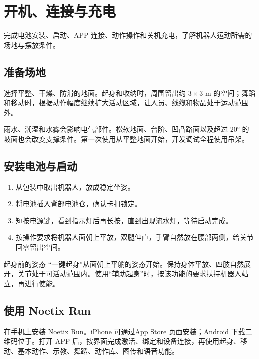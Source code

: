 \chapter{开机、连接与充电}

\begin{intro}
完成电池安装、启动、APP 连接、动作操作和关机充电，了解机器人运动所需的场地与摆放条件。
\end{intro}
\section{准备场地}
选择平整、干燥、防滑的地面。起身和收纳时，周围留出约 $3\times3$ m 的空间；舞蹈和移动时，根据动作幅度继续扩大活动区域，让人员、线缆和物品处于运动范围外。

雨水、潮湿和水雾会影响电气部件。松软地面、台阶、凹凸路面以及超过 20° 的坡面也会改变支撑条件。第一次使用从平整地面开始，开发调试全程使用吊架。
\section{安装电池与启动}
\begin{enumerate}
\item 从包装中取出机器人，放成稳定坐姿。
\item 将电池插入背部电池仓，确认卡扣锁定。
\item 短按电源键，看到指示灯后再长按，直到出现流水灯，等待启动完成。
\item 按操作要求将机器人面朝上平放，双腿伸直，手臂自然放在腰部两侧，给关节回零留出空间。
\end{enumerate}
\begin{remark}{起身前的姿态}
“一键起身”从面朝上平躺的姿态开始。保持身体平放、四肢自然展开，关节处于可活动范围内。使用“辅助起身”时，按该功能的要求扶持机器人站立，再进行使能。
\end{remark}
\section{使用 Noetix Run}
在手机上安装 Noetix Run。iPhone 可通过\href{https://apps.apple.com/cn/app/noetix-run/id6751874215}{App Store 页面}安装；Android 下载二维码位于。打开 APP 后，按界面完成激活、绑定和设备连接，再使用起身、移动、基本动作、示教、舞蹈、动作库、图传和语音功能。

